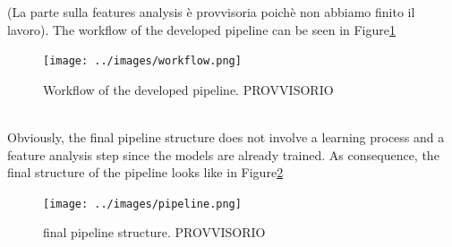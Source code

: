 \documentclass{standalone}
\begin{document}
(La parte sulla features analysis è provvisoria poichè non abbiamo finito il lavoro).
The workflow of the developed pipeline can be seen in Figure\ref{workflow}
\begin{figure}[htp]

    \centering
    \texttt{[image: ../images/workflow.png]}
    
    \caption{Workflow of the developed pipeline. PROVVISORIO}
    \label{workflow}
    
    \end{figure}
    \\
Obviously, the final pipeline structure does not involve a learning process and a feature analysis step since the models are already trained.
As consequence, the final structure of the pipeline looks like in Figure\ref{pipeline}
\begin{figure}[htp]

    \centering
    \texttt{[image: ../images/pipeline.png]}
    
    \caption{final pipeline structure. PROVVISORIO}
    \label{pipeline}
    
    \end{figure}
\end{document}

